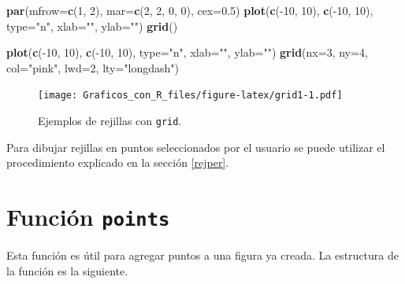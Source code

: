 \documentclass[10pt,]{krantz}
\makeatletter
\newenvironment{Shaded}{\begin{snugshade}}{\end{snugshade}}
\newcommand{\KeywordTok}[1]{\textcolor[rgb]{0.13,0.29,0.53}{\textbf{{#1}}}}
\newcommand{\DataTypeTok}[1]{\textcolor[rgb]{0.13,0.29,0.53}{{#1}}}
\newcommand{\DecValTok}[1]{\textcolor[rgb]{0.00,0.00,0.81}{{#1}}}
\newcommand{\FloatTok}[1]{\textcolor[rgb]{0.00,0.00,0.81}{{#1}}}
\newcommand{\StringTok}[1]{\textcolor[rgb]{0.31,0.60,0.02}{{#1}}}
\newcommand{\NormalTok}[1]{{#1}}
\newenvironment{kframe}{%
\medskip{}
\setlength{\fboxsep}{.8em}
 \def\at@end@of@kframe{}%
 \ifinner\ifhmode%
  \def\at@end@of@kframe{\end{minipage}}%
  \begin{minipage}{\columnwidth}%
 \fi\fi%
 \def\FrameCommand##1{\hskip\@totalleftmargin \hskip-\fboxsep
 \colorbox{shadecolor}{##1}\hskip-\fboxsep
     \hskip-\linewidth \hskip-\@totalleftmargin \hskip\columnwidth}%
 \MakeFramed {\advance\hsize-\width
   \@totalleftmargin\z@ \linewidth\hsize
   \@setminipage}}%
 {\par\unskip\endMakeFramed%
 \at@end@of@kframe}
\renewenvironment{Shaded}{\begin{kframe}}{\end{kframe}}
\let\BeginKnitrBlock\begin \let\EndKnitrBlock\end
\makeatother
\begin{document}
\begin{Shaded}
\begin{Highlighting}[]
\KeywordTok{par}\NormalTok{(}\DataTypeTok{mfrow=}\KeywordTok{c}\NormalTok{(}\DecValTok{1}\NormalTok{, }\DecValTok{2}\NormalTok{), }\DataTypeTok{mar=}\KeywordTok{c}\NormalTok{(}\DecValTok{2}\NormalTok{, }\DecValTok{2}\NormalTok{, }\DecValTok{0}\NormalTok{, }\DecValTok{0}\NormalTok{), }\DataTypeTok{cex=}\FloatTok{0.5}\NormalTok{)}
\KeywordTok{plot}\NormalTok{(}\KeywordTok{c}\NormalTok{(-}\DecValTok{10}\NormalTok{, }\DecValTok{10}\NormalTok{), }\KeywordTok{c}\NormalTok{(-}\DecValTok{10}\NormalTok{, }\DecValTok{10}\NormalTok{), }\DataTypeTok{type=}\StringTok{"n"}\NormalTok{, }\DataTypeTok{xlab=}\StringTok{""}\NormalTok{, }\DataTypeTok{ylab=}\StringTok{""}\NormalTok{)}
\KeywordTok{grid}\NormalTok{()}

\KeywordTok{plot}\NormalTok{(}\KeywordTok{c}\NormalTok{(-}\DecValTok{10}\NormalTok{, }\DecValTok{10}\NormalTok{), }\KeywordTok{c}\NormalTok{(-}\DecValTok{10}\NormalTok{, }\DecValTok{10}\NormalTok{), }\DataTypeTok{type=}\StringTok{"n"}\NormalTok{, }\DataTypeTok{xlab=}\StringTok{""}\NormalTok{, }\DataTypeTok{ylab=}\StringTok{""}\NormalTok{)}
\KeywordTok{grid}\NormalTok{(}\DataTypeTok{nx=}\DecValTok{3}\NormalTok{, }\DataTypeTok{ny=}\DecValTok{4}\NormalTok{, }\DataTypeTok{col=}\StringTok{"pink"}\NormalTok{, }\DataTypeTok{lwd=}\DecValTok{2}\NormalTok{, }\DataTypeTok{lty=}\StringTok{"longdash"}\NormalTok{)}
\end{Highlighting}
\end{Shaded}

\begin{figure}[htbp]
\centering
\texttt{[image: Graficos\_con\_R\_files/figure-latex/grid1-1.pdf]}
\caption{\label{fig:grid1}Ejemplos de rejillas con \texttt{grid}.}
\end{figure}

\BeginKnitrBlock{rmdtip}
Para dibujar rejillas en puntos seleccionados por el usuario se puede
utilizar el procedimiento explicado en la sección \ref{rejper}.
\EndKnitrBlock{rmdtip}

\section{\texorpdfstring{Función \texttt{points} 
}{Función points  }}\label{funcion-points}

Esta función es útil para agregar puntos a una figura ya creada. La
estructura de la función es la siguiente.
\end{document}
